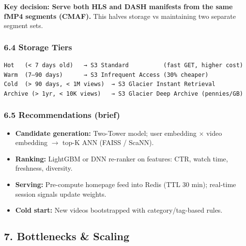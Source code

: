 \documentclass[11pt]{article}
\providecommand{\tightlist}{\setlength{\itemsep}{1pt}\setlength{\parskip}{0pt}}
\begin{document}
\textbf{Key decision: Serve both HLS and DASH manifests from the same fMP4 segments (CMAF).} This halves storage vs maintaining two separate segment sets.

\subsubsection{6.4 Storage Tiers}\label{64-storage-tiers}

\setcodelang{}

\begin{verbatim}
Hot   (< 7 days old)   → S3 Standard          (fast GET, higher cost)
Warm  (7–90 days)      → S3 Infrequent Access (30% cheaper)
Cold  (> 90 days, < 1M views)  → S3 Glacier Instant Retrieval
Archive (> 1yr, < 10K views)   → S3 Glacier Deep Archive (pennies/GB)
\end{verbatim}

\subsubsection{6.5 Recommendations (brief)}\label{65-recommendations-brief}

\begin{itemize}
\tightlist
\item
  \textbf{Candidate generation:} Two-Tower model; user embedding \(\times\) video embedding \(\rightarrow\) top-K ANN (FAISS / ScaNN).
\item
  \textbf{Ranking:} LightGBM or DNN re-ranker on features: CTR, watch time, freshness, diversity.
\item
  \textbf{Serving:} Pre-compute homepage feed into Redis (TTL 30 min); real-time session signals update weights.
\item
  \textbf{Cold start:} New videos bootstrapped with category/tag-based rules.
\end{itemize}

\subsection{7. Bottlenecks \& Scaling}\label{7-bottlenecks--scaling}
\end{document}
